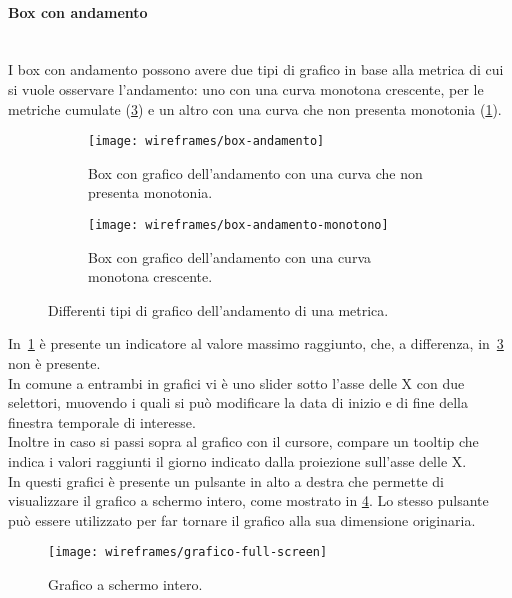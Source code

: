 \documentclass[../../../main.tex]{subfiles}
\begin{document}
\paragraph{Box con andamento}\mbox{}\\
I box con andamento possono avere due tipi di grafico in base alla metrica di cui si vuole osservare l'andamento: uno con una curva monotona crescente, per le metriche cumulate (\ref{fig:box-andamento-monotono}) e un altro con una curva che non presenta monotonia (\ref{fig:box-andamento-no-monotonia}). 
\begin{figure}[H]
    \begin{subfigure}[b]{0.5\textwidth}
        \centering
        \texttt{[image: wireframes/box-andamento]}
        \caption{Box con grafico dell'andamento con una curva che non presenta monotonia.}\label{fig:box-andamento-no-monotonia}
    \end{subfigure}
\hfill
    \begin{subfigure}[b]{0.5\textwidth}
        \centering
        \texttt{[image: wireframes/box-andamento-monotono]}
        \caption{Box con grafico dell'andamento con una curva monotona crescente.}
        \label{fig:box-andamento-monotono}
    \end{subfigure}
    \caption{Differenti tipi di grafico dell'andamento di una metrica.}
\end{figure}

In~\ref{fig:box-andamento-no-monotonia} è presente un indicatore al valore massimo raggiunto, che, a differenza, in~\ref{fig:box-andamento-monotono} non è presente.\\
In comune a entrambi in grafici vi è uno slider sotto l'asse delle X con due selettori, muovendo i quali si può modificare la data di inizio e di fine della finestra temporale di interesse.\\
Inoltre in caso si passi sopra al grafico con il cursore, compare un tooltip che indica i valori raggiunti il giorno indicato dalla proiezione sull'asse delle X.\\
In questi grafici è presente un pulsante in alto a destra che permette di visualizzare il grafico a schermo intero, come mostrato in \ref{fig:grafico-full-screen}. Lo stesso pulsante può essere utilizzato per far tornare il grafico alla sua dimensione originaria.
\begin{figure}[H]
    \centering
    \texttt{[image: wireframes/grafico-full-screen]}
    \caption{Grafico a schermo intero.}
    \label{fig:grafico-full-screen}
\end{figure}
\end{document}
